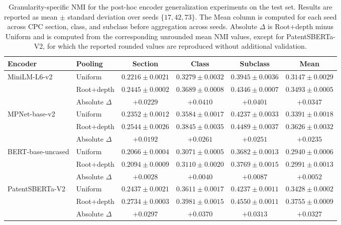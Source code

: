 \begin{table}[t]
\centering
\small
\setlength{\tabcolsep}{6.5pt}
\renewcommand{\arraystretch}{1.12}
\caption{Granularity-specific NMI for the post-hoc encoder generalization experiments on the test set. Results are reported as mean $\pm$ standard deviation over seeds $\{17,42,73\}$. The Mean column is computed for each seed across CPC section, class, and subclass before aggregation across seeds. Absolute $\Delta$ is Root+depth minus Uniform and is computed from the corresponding unrounded mean NMI values, except for PatentSBERTa-V2, for which the reported rounded values are reproduced without additional validation.}
\label{tab:encoder_generalization_detailed}
\begin{tabular}{@{}llcccc@{}}
\toprule
\textbf{Encoder} & \textbf{Pooling} & \textbf{Section} & \textbf{Class} & \textbf{Subclass} & \textbf{Mean} \\
\midrule
\multirow{3}{*}{MiniLM-L6-v2}
& Uniform & $0.2216 \pm 0.0021$ & $0.3279 \pm 0.0032$ & $0.3945 \pm 0.0036$ & $0.3147 \pm 0.0029$ \\
& Root+depth & $\mathbf{0.2445 \pm 0.0002}$ & $\mathbf{0.3689 \pm 0.0008}$ & $\mathbf{0.4346 \pm 0.0007}$ & $\mathbf{0.3493 \pm 0.0005}$ \\
& Absolute $\Delta$ & $\mathbf{+0.0229}$ & $\mathbf{+0.0410}$ & $\mathbf{+0.0401}$ & $\mathbf{+0.0347}$ \\
\midrule
\multirow{3}{*}{MPNet-base-v2}
& Uniform & $0.2352 \pm 0.0012$ & $0.3584 \pm 0.0017$ & $0.4237 \pm 0.0033$ & $0.3391 \pm 0.0018$ \\
& Root+depth & $\mathbf{0.2544 \pm 0.0026}$ & $\mathbf{0.3845 \pm 0.0035}$ & $\mathbf{0.4489 \pm 0.0037}$ & $\mathbf{0.3626 \pm 0.0032}$ \\
& Absolute $\Delta$ & $\mathbf{+0.0192}$ & $\mathbf{+0.0261}$ & $\mathbf{+0.0251}$ & $\mathbf{+0.0235}$ \\
\midrule
\multirow{3}{*}{BERT-base-uncased}
& Uniform & $0.2066 \pm 0.0004$ & $0.3071 \pm 0.0005$ & $0.3682 \pm 0.0013$ & $0.2940 \pm 0.0006$ \\
& Root+depth & $\mathbf{0.2094 \pm 0.0009}$ & $\mathbf{0.3110 \pm 0.0020}$ & $\mathbf{0.3769 \pm 0.0015}$ & $\mathbf{0.2991 \pm 0.0013}$ \\
& Absolute $\Delta$ & $\mathbf{+0.0028}$ & $\mathbf{+0.0040}$ & $\mathbf{+0.0087}$ & $\mathbf{+0.0052}$ \\
\midrule
\multirow{3}{*}{PatentSBERTa-V2}
& Uniform & $0.2437 \pm 0.0021$ & $0.3611 \pm 0.0017$ & $0.4237 \pm 0.0011$ & $0.3428 \pm 0.0002$ \\
& Root+depth & $\mathbf{0.2734 \pm 0.0003}$ & $\mathbf{0.3981 \pm 0.0015}$ & $\mathbf{0.4550 \pm 0.0011}$ & $\mathbf{0.3755 \pm 0.0009}$ \\
& Absolute $\Delta$ & $\mathbf{+0.0297}$ & $\mathbf{+0.0370}$ & $\mathbf{+0.0313}$ & $\mathbf{+0.0327}$ \\
\bottomrule
\end{tabular}
\end{table}
